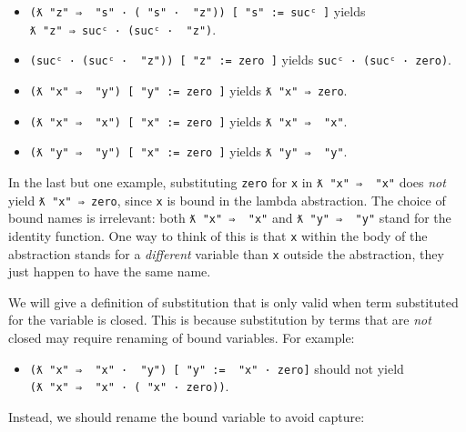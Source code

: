 \begin{itemize}
\tightlist
\item
  \texttt{(ƛ\ "z"\ ⇒\ \textasciigrave{}\ "s"\ ·\ (\textasciigrave{}\ "s"\ ·\ \textasciigrave{}\ "z"))\ {[}\ "s"\ :=\ sucᶜ\ {]}}
  yields \texttt{ƛ\ "z"\ ⇒\ sucᶜ\ ·\ (sucᶜ\ ·\ \textasciigrave{}\ "z")}.
\item
  \texttt{(sucᶜ\ ·\ (sucᶜ\ ·\ \textasciigrave{}\ "z"))\ {[}\ "z"\ :=\ \textasciigrave{}zero\ {]}}
  yields \texttt{sucᶜ\ ·\ (sucᶜ\ ·\ \textasciigrave{}zero)}.
\item
  \texttt{(ƛ\ "x"\ ⇒\ \textasciigrave{}\ "y")\ {[}\ "y"\ :=\ \textasciigrave{}zero\ {]}}
  yields \texttt{ƛ\ "x"\ ⇒\ \textasciigrave{}zero}.
\item
  \texttt{(ƛ\ "x"\ ⇒\ \textasciigrave{}\ "x")\ {[}\ "x"\ :=\ \textasciigrave{}zero\ {]}}
  yields \texttt{ƛ\ "x"\ ⇒\ \textasciigrave{}\ "x"}.
\item
  \texttt{(ƛ\ "y"\ ⇒\ \textasciigrave{}\ "y")\ {[}\ "x"\ :=\ \textasciigrave{}zero\ {]}}
  yields \texttt{ƛ\ "y"\ ⇒\ \textasciigrave{}\ "y"}.
\end{itemize}

In the last but one example, substituting \texttt{\textasciigrave{}zero}
for \texttt{x} in \texttt{ƛ\ "x"\ ⇒\ \textasciigrave{}\ "x"} does
\emph{not} yield \texttt{ƛ\ "x"\ ⇒\ \textasciigrave{}zero}, since
\texttt{x} is bound in the lambda abstraction. The choice of bound names
is irrelevant: both \texttt{ƛ\ "x"\ ⇒\ \textasciigrave{}\ "x"} and
\texttt{ƛ\ "y"\ ⇒\ \textasciigrave{}\ "y"} stand for the identity
function. One way to think of this is that \texttt{x} within the body of
the abstraction stands for a \emph{different} variable than \texttt{x}
outside the abstraction, they just happen to have the same name.

We will give a definition of substitution that is only valid when term
substituted for the variable is closed. This is because substitution by
terms that are \emph{not} closed may require renaming of bound
variables. For example:

\begin{itemize}
\tightlist
\item
  \texttt{(ƛ\ "x"\ ⇒\ \textasciigrave{}\ "x"\ ·\ \textasciigrave{}\ "y")\ {[}\ "y"\ :=\ \textasciigrave{}\ "x"\ ·\ \textasciigrave{}zero{]}}
  should not yield
  \texttt{(ƛ\ "x"\ ⇒\ \textasciigrave{}\ "x"\ ·\ (\textasciigrave{}\ "x"\ ·\ \textasciigrave{}zero))}.
\end{itemize}

Instead, we should rename the bound variable to avoid capture:

